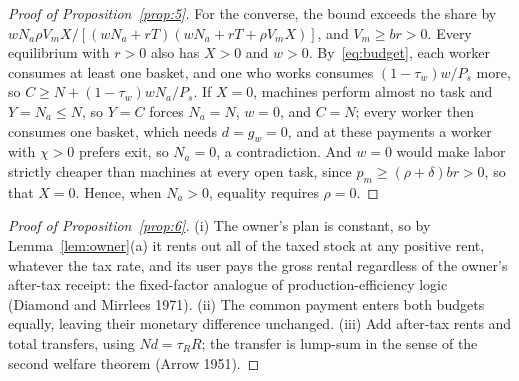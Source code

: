 \documentclass[12pt]{article}
\theoremstyle{plain}
\theoremstyle{definition}
\theoremstyle{remark}
\begin{document}
\begin{proof}[Proof of Proposition~\ref{prop:5}]
For the converse, the bound exceeds the share by $wN_a\rho V_mX/[(wN_a+rT)(wN_a+rT+\rho V_mX)]$, and $V_m\ge br>0$. Every equilibrium with $r>0$ also has $X>0$ and $w>0$. By~\eqref{eq:budget}, each worker consumes at least one basket, and one who works consumes $(1-\tau_w)w/P_s$ more, so $C\ge N+(1-\tau_w)wN_a/P_s$. If $X=0$, machines perform almost no task and $Y=N_a\le N$, so $Y=C$ forces $N_a=N$, $w=0$, and $C=N$; every worker then consumes one basket, which needs $d=g_w=0$, and at these payments a worker with $\chi>0$ prefers exit, so $N_a=0$, a contradiction. And $w=0$ would make labor strictly cheaper than machines at every open task, since $p_m\ge(\rho+\delta)br>0$, so that $X=0$. Hence, when $N_a>0$, equality requires $\rho=0$.
\end{proof}

\begin{proof}[Proof of Proposition~\ref{prop:6}]
(i) The owner's plan is constant, so by Lemma~\ref{lem:owner}(a) it rents out all of the taxed stock at any positive rent, whatever the tax rate, and its user pays the gross rental regardless of the owner's after-tax receipt: the fixed-factor analogue of production-efficiency logic (Diamond and Mirrlees 1971). (ii) The common payment enters both budgets equally, leaving their monetary difference unchanged. (iii) Add after-tax rents and total transfers, using $Nd=\tau_RR$; the transfer is lump-sum in the sense of the second welfare theorem (Arrow 1951).
\end{proof}
\end{document}

